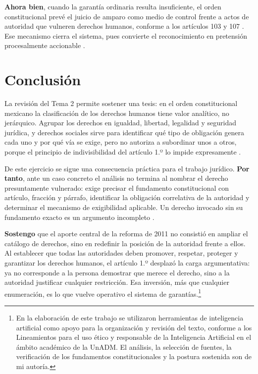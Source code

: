 \documentclass[
  spanish,
  letterpaper, oneside
]{article}
\begin{document}
\textbf{Ahora bien}, cuando la garantía ordinaria resulta insuficiente, el orden constitucional prevé el juicio de amparo como medio de control frente a actos de autoridad que vulneren derechos humanos, conforme a los artículos 103 y 107 \citep{cpeum2026}. Ese mecanismo cierra el sistema, pues convierte el reconocimiento en pretensión procesalmente accionable \citep{marcanoSalazarDerechosHumanos}.

\clearpage
\section{Conclusión}

La revisión del Tema 2 permite sostener una tesis: en el orden constitucional mexicano la clasificación de los derechos humanos tiene valor analítico, no jerárquico. Agrupar los derechos en igualdad, libertad, legalidad y seguridad jurídica, y derechos sociales sirve para identificar qué tipo de obligación genera cada uno y por qué vía se exige, pero no autoriza a subordinar unos a otros, porque el principio de indivisibilidad del artículo 1.º lo impide expresamente \citep{cpeum2026}.

De este ejercicio se sigue una consecuencia práctica para el trabajo jurídico. \textbf{Por tanto}, ante un caso concreto el análisis no termina al nombrar el derecho presuntamente vulnerado: exige precisar el fundamento constitucional con artículo, fracción y párrafo, identificar la obligación correlativa de la autoridad y determinar el mecanismo de exigibilidad aplicable. Un derecho invocado sin su fundamento exacto es un argumento incompleto \citep{cndhInehrmArticulo1o2015}.

\textbf{Sostengo} que el aporte central de la reforma de 2011 no consistió en ampliar el catálogo de derechos, sino en redefinir la posición de la autoridad frente a ellos. Al establecer que todas las autoridades deben promover, respetar, proteger y garantizar los derechos humanos, el artículo 1.º desplazó la carga argumentativa: ya no corresponde a la persona demostrar que merece el derecho, sino a la autoridad justificar cualquier restricción. Esa inversión, más que cualquier enumeración, es lo que vuelve operativo el sistema de garantías.\footnote{En la elaboración de este trabajo se utilizaron herramientas de inteligencia artificial como apoyo para la organización y revisión del texto, conforme a los Lineamientos para el uso ético y responsable de la Inteligencia Artificial en el ámbito académico de la UnADM. El análisis, la selección de fuentes, la verificación de los fundamentos constitucionales y la postura sostenida son de mi autoría.}

\clearpage

\end{document}

